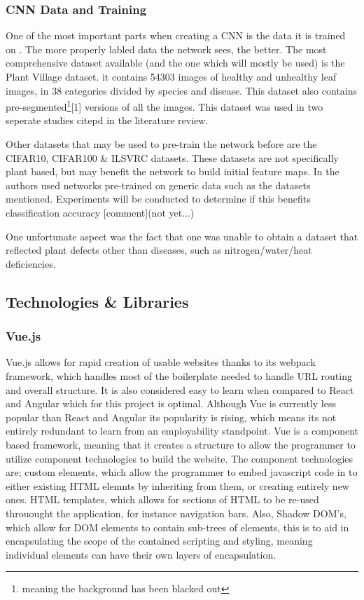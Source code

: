     \subsubsection{CNN Data and Training}
      One of the most important parts when creating a CNN is the data it is trained on \citep{Halevy2009}. The more properly labled data the network sees, the better. The most comprehensive dataset available (and the one which will mostly be used) is the Plant Village dataset. it contains 54303 images of healthy and unhealthy leaf images, in 38 categories divided by species and disease. This dataset also contains pre-segmented\footnote{meaning the background has been blacked out}[1] versions of all the images. This dataset was used in two seperate studies citepd in the literature review.
      \par
      Other datasets that may be used to pre-train the network before are the CIFAR10, CIFAR100 \& ILSVRC datasets. These datasets are not specifically plant based, but may benefit the network to build initial feature maps. In \citep{Choi} the authors used networks pre-trained on generic data such as the datasets mentioned. Experiments will be conducted to determine if this benefits classification accuracy [comment](not yet...)
      \par
      One unfortunate aspect was the fact that one was unable to obtain a dataset that reflected plant defects other than diseases, such as nitrogen/water/heat deficiencies.


\subsection{Technologies \& Libraries}
  \subsubsection{Vue.js}
    Vue.js allows for rapid creation of usable websites thanks to its webpack framework, which handles most of the boilerplate needed to handle URL routing and overall structure. It is also considered easy to learn when compared to React and Angular \citep{StudiengangBachelor} which for this project is optimal. Although Vue is currently less popular than React and Angular its popularity is rising, which means its not entirely redundant to learn from an employability standpoint. Vue is a component based framework, meaning that it creates a structure to allow the programmer to utilize component technologies to build the website. The component technologies are; custom elements, which allow the programmer to embed javascript code in to either existing HTML elemnts by inheriting from them, or creating entirely new ones. HTML templates, which allows for sections of HTML to be re-used throuought the application, for instance navigation bars. Also, Shadow DOM's, which allow for DOM elements to contain sub-trees of elements, this is to aid in encapsulating the scope of the contained scripting and styling, meaning individual elements can have their own layers of encapsulation.

